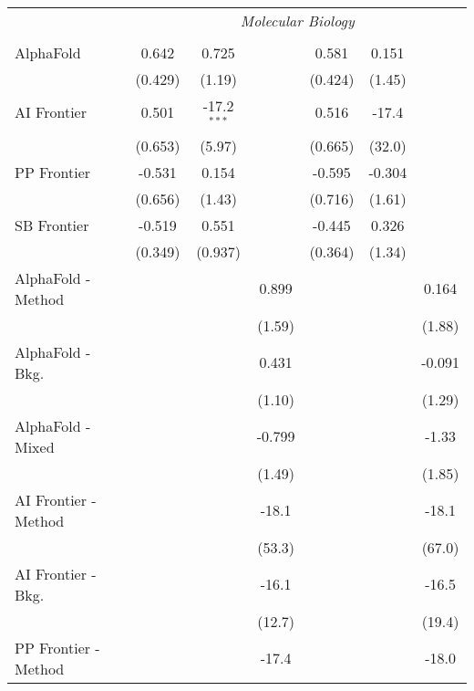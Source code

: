 \begin{tabular}{lcccccc}
 & \multicolumn{6}{c}{\textit{Molecular Biology}} \\ \\
   AlphaFold            & 0.642   & 0.725         &         & 0.581   & 0.151  &   \\   
                        & (0.429) & (1.19)        &         & (0.424) & (1.45) &   \\   
   AI Frontier          & 0.501   & -17.2$^{***}$ &         & 0.516   & -17.4  &   \\   
                        & (0.653) & (5.97)        &         & (0.665) & (32.0) &   \\   
   PP Frontier          & -0.531  & 0.154         &         & -0.595  & -0.304 &   \\   
                        & (0.656) & (1.43)        &         & (0.716) & (1.61) &   \\   
   SB Frontier          & -0.519  & 0.551         &         & -0.445  & 0.326  &   \\   
                        & (0.349) & (0.937)       &         & (0.364) & (1.34) &   \\   
   AlphaFold - Method   &         &               & 0.899   &         &        & 0.164\\   
                        &         &               & (1.59)  &         &        & (1.88)\\   
   AlphaFold - Bkg.     &         &               & 0.431   &         &        & -0.091\\   
                        &         &               & (1.10)  &         &        & (1.29)\\   
   AlphaFold - Mixed    &         &               & -0.799  &         &        & -1.33\\   
                        &         &               & (1.49)  &         &        & (1.85)\\   
   AI Frontier - Method &         &               & -18.1   &         &        & -18.1\\   
                        &         &               & (53.3)  &         &        & (67.0)\\   
   AI Frontier - Bkg.   &         &               & -16.1   &         &        & -16.5\\   
                        &         &               & (12.7)  &         &        & (19.4)\\   
   PP Frontier - Method &         &               & -17.4   &         &        & -18.0\\   

\end{tabular}
